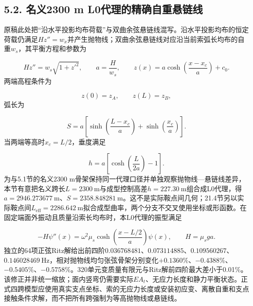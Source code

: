 \documentclass[UTF8,a4paper,11pt,fontset=none]{ctexart}
\begin{document}
\subsection*{5.2. 名义2300 m L0代理的精确自重悬链线}
原稿此处把“沿水平投影均布荷载”与双曲余弦悬链线混写。沿水平投影均布的恒定荷载仍满足\(Hz''=w_x\)\allowbreak{}并产生抛物线；双曲余弦悬链线对应沿当前索弧长均布的自重\(w_s\)\allowbreak{}，其平衡方程和参数为\par
\[
Hz''=w_s\sqrt{1+z'^2},
\qquad
a=\frac{H}{w_s},
\qquad
z(x)=a\cosh\left(\frac{x-x_c}{a}\right)+c_0.
\]
两端高程条件为\par
\[
z(0)=z_A,\qquad z(L)=z_B,
\]
弧长为\par
\[
S=a\left[
\sinh\left(\frac{L-x_c}{a}\right)
+
\sinh\left(\frac{x_c}{a}\right)
\right].
\]
当两端等高时\(x_c=L/2\)\allowbreak{}，垂度满足\par
\[
h=a\left[
\cosh\left(\frac{L}{2a}\right)-1
\right].
\]
为与5.1节的名义2300 m骨架保持同一代理口径并单独观察抛物线—悬链线差异，本节有意把名义跨长\(L=2300\ \mathrm m\)\allowbreak{}与成型控制高差\(h=227.30\ \mathrm m\)\allowbreak{}组合成L0代理，得\(a=2946.273677\ \mathrm m\)\allowbreak{}、\(S=2358.848281\ \mathrm m\)\allowbreak{}。这不是实际鞍点间几何；21.4节另以实际鞍点间\(L_{\mathrm{eff}}=2286.642\ \mathrm m\)\allowbreak{}拟合成型曲率，两个分支不交叉使用坐标或形函数。在固定端面外振动且质量沿索长均布时，本L0代理的振型满足\par
\[
-H\psi''(x)
=\omega^2\mu_s
\cosh\left(\frac{x-L/2}{a}\right)\psi(x),
\qquad H=\mu_sga.
\]
独立的64项正弦Ritz解给出前四阶\(0.036768481\)\allowbreak{}、\(0.073114885\)\allowbreak{}、\(0.109560267\)\allowbreak{}、\(0.146028469\ \mathrm{Hz}\)\allowbreak{}，相对抛物线均匀张弦骨架分别变化\(+0.1360\%\)\allowbreak{}、\(-0.4388\%\)\allowbreak{}、\(-0.5405\%\)\allowbreak{}、\(-0.5758\%\)\allowbreak{}。320单元变质量有限元与Ritz解前四阶最大差小于0.01\%。该修正并非统一缩放；面内竖弯仍需要实际\(EA_t\)\allowbreak{}、无应力长度和静力平衡状态。正式四跨模型应使用真实支点坐标、索的无应力长度或安装初应变、离散自重和支点接触条件求解，而不把所有跨强制为等高抛物线或悬链线。\par
{}
\end{document}
